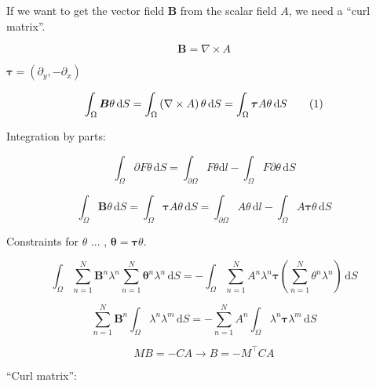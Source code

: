 \noindent If we want to get the vector field $\bm{B}$ from the scalar field $A$, we need a “curl matrix”.

\begin{equation} \label{eq:ap27}
\bm{B} = \nabla \times A
\end{equation}

\noindent  $\bm{\tau} = \left(\partial_y,-\partial_x\right)$

\begin{equation} \label{eq:ap28}
\int_{\Omega} \bm{B} \theta \,\mathrm{d}S = \int_{\Omega} \left( \nabla \times A \right) \theta \,\mathrm{d}S
= \int_{\Omega} \bm{\tau} A \theta \,\mathrm{d}S \numberthis 
\end{equation}

\noindent Integration by parts:

\begin{equation} \label{eq:ap29}
\int_{\Omega} \partial F \theta \,\mathrm{d}S = \int_{\partial\Omega}  F \theta \mathrm{d}l  - \int_{\Omega} F \partial \theta \,\mathrm{d}S
\end{equation}

\begin{equation} \label{eq:ap30}
\int_{\Omega} \bm{B} \theta \,\mathrm{d}S = \int_{\Omega} \bm{\tau} A \theta \,\mathrm{d}S = \int_{\partial\Omega} A \theta \,\mathrm{d}l - \int_{\Omega} A \bm{\tau} \theta \,\mathrm{d}S
\end{equation}

\noindent Constraints for $\theta$ ... , $\bm{\theta} = \bm{\tau} \theta$.

\begin{equation} \label{eq:ap40} \int_{\Omega} \sum_{n=1}^{N} \bm{B}^n \lambda^n \sum_{n=1}^{N} \bm{\theta}^n \lambda^n \,\mathrm{d}S = -\int_{\Omega} \sum_{n=1}^{N} A^n \lambda^n  \bm{\tau} \left(  \sum_{n=1}^{N} \theta^n \lambda^n \right) \,\mathrm{d}S 
\end{equation}

\begin{equation} \label{eq:ap41} \sum_{n=1}^{N} \bm{B}^n \int_{\Omega} \lambda^n \lambda^m \,\mathrm{d}S =  -\sum_{n=1}^{N}  A^n \int_{\Omega} \lambda^n  \bm{\tau} \lambda^m  \,\mathrm{d}S 
\end{equation}

\begin{equation} \label{eq:ap42} M B = - C A \rightarrow B = - M^{\top} C A
\end{equation}

\noindent “Curl matrix”:

